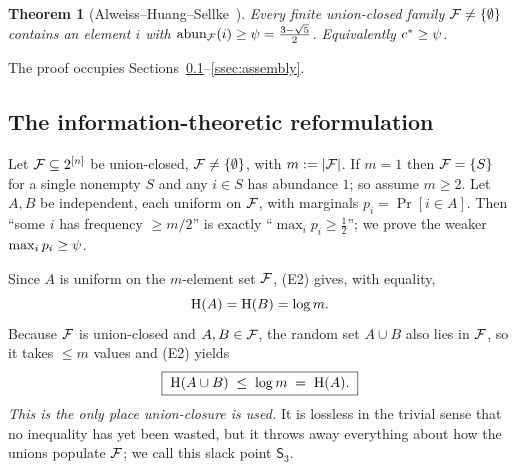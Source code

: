 \documentclass[11pt]{amsart}
\newtheorem{theorem}{Theorem}[section]
\theoremstyle{definition}
\theoremstyle{remark}
\begin{document}
\begin{theorem}[Alweiss--Huang--Sellke~\cite{ahs2023}]\label{thm:ahs}
Every finite union-closed family $\mathcal{F}\neq\{\emptyset\}$ contains an element $i$
with $\operatorname{abun}_{\mathcal{F}}(i)\ge\psi=\tfrac{3-\sqrt{5}}{2}$. Equivalently $c^{\ast}\ge\psi$.
\end{theorem}

The proof occupies Sections~\ref{ssec:reform}--\ref{ssec:assembly}.

\subsection{The information-theoretic reformulation}\label{ssec:reform}
Let $\mathcal{F}\subseteq2^{[n]}$ be union-closed, $\mathcal{F}\neq\{\emptyset\}$, with
$m:=|\mathcal{F}|$. If $m=1$ then $\mathcal{F}=\{S\}$ for a single nonempty $S$ and any $i\in S$
has abundance $1$; so assume $m\ge 2$. Let $A,B$ be independent, each uniform on
$\mathcal{F}$, with marginals $p_i=\Pr[i\in A]$. Then ``some $i$ has frequency $\ge m/2$''
is exactly ``$\max_i p_i\ge\tfrac12$''; we prove the weaker $\max_i p_i\ge\psi$.

Since $A$ is uniform on the $m$-element set $\mathcal{F}$, (E2) gives, with equality,
\begin{equation}\label{eq:HA}
   \operatorname{H}(A)=\operatorname{H}(B)=\log m.
\end{equation}
Because $\mathcal{F}$ is union-closed and $A,B\in\mathcal{F}$, the random set $A\cup B$ also lies
in $\mathcal{F}$, so it takes $\le m$ values and (E2) yields
\begin{equation}\label{eq:union-cap}
   \boxed{\;\operatorname{H}(A\cup B)\;\le\;\log m\;=\;\operatorname{H}(A).\;}
\end{equation}
\emph{This is the only place union-closure is used.} It is lossless in the
trivial sense that no inequality has yet been wasted, but it throws away
everything about how the unions populate $\mathcal{F}$; we call this slack point
$\mathsf S_3$.
\end{document}
